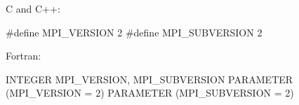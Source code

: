C and C++:

#define MPI_VERSION 2
#define MPI_SUBVERSION 2

Fortran:

INTEGER MPI_VERSION, MPI_SUBVERSION
PARAMETER (MPI_VERSION = 2)
PARAMETER (MPI_SUBVERSION = 2)

